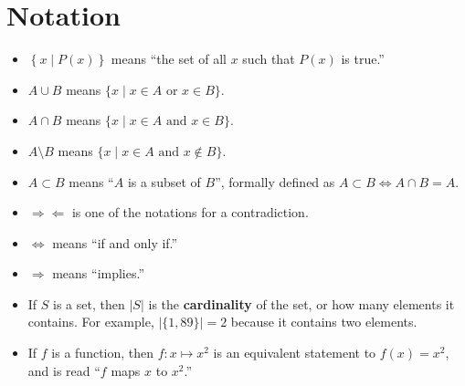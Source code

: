 \documentclass[12pt, letterpaper]{article}
\begin{document}
\section*{Notation}
\begin{itemize}
    \item \(\left\{ x \mid P(x) \right\} \) means ``the set of all \(x\) such that \(P(x)\) is true.''
    \item \(A \cup B\) means \(\{ x \mid x\in A \text{ or }x\in B  \} \).
    \item \(A\cap B\) means \(\{ x \mid x\in A \text{ and }x\in B  \} \).
    \item \(A\setminus B\) means \(\{ x \mid x\in A \text{ and }x\notin B  \} \).
    \item \(A \subset B\) means ``\(A\) is a subset of \(B\)'', formally defined as \(A \subset B \iff A \cap B = A\). 
    \item \(\Longrightarrow \Longleftarrow\) is one of the notations for a contradiction.
    \item \(\iff \) means ``if and only if.''
    \item \(\Longrightarrow \) means ``implies.''
    \item If \(S\) is a set, then \(\vert S \vert \) is the \textbf{cardinality} of the set, or how many elements it contains. For example, \(\vert \{ 1,89 \}  \vert=2 \) because it contains two elements.
    \item If \(f\) is a function, then \(f:x\mapsto x^2\) is an equivalent statement to \(f(x)=x^2\), and is read ``\(f\) maps \(x\) to \(x^2\).''
\end{itemize}
\newpage
\end{document}
